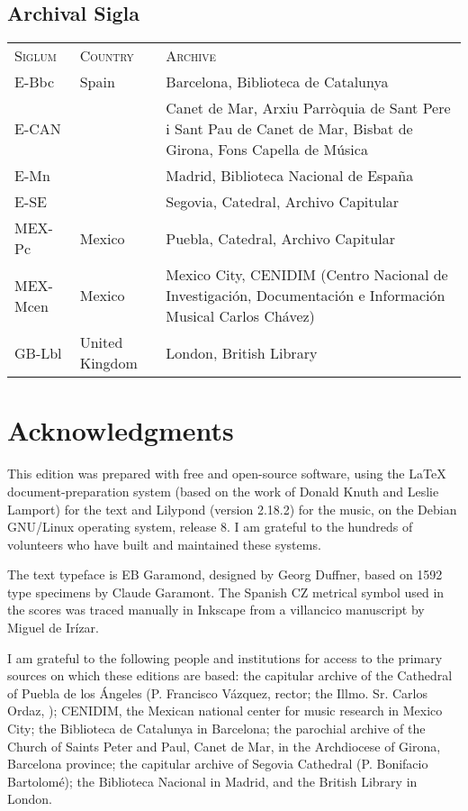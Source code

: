 \subsection{Archival Sigla}

\begin{tabu} to \textwidth{llZ}
\textsc{Siglum} & \textsc{Country} & \textsc{Archive}\\
E-Bbc & Spain & Barcelona, Biblioteca de Catalunya\\
E-CAN &  & Canet de Mar, Arxiu Parròquia de Sant Pere i Sant Pau de Canet de Mar, Bisbat de Girona, Fons Capella de Música\\
E-Mn & &  Madrid, Biblioteca Nacional de España\\
E-SE & & Segovia, Catedral, Archivo Capitular\\
MEX-Pc & Mexico &  Puebla, Catedral, Archivo Capitular\\
MEX-Mcen & Mexico & Mexico City, CENIDIM (Centro Nacional de Investigación, Documentación e Información Musical Carlos Chávez)\\
GB-Lbl & United Kingdom & London, British Library\\
\end{tabu}


\section{Acknowledgments}

This edition was prepared with free and open-source software, using the \LaTeX{} document-preparation system (based on the work of Donald Knuth and Leslie Lamport) for the text and Lilypond (version 2.18.2) for the music, on the Debian GNU/Linux operating system, release 8. 
I am grateful to the hundreds of volunteers who have built and maintained these systems.

The text typeface is EB Garamond, designed by Georg Duffner, based on 1592 type specimens by Claude Garamont.
The Spanish CZ metrical symbol used in the scores was traced manually in Inkscape from a villancico manuscript by Miguel de Irízar.

I am grateful to the following people and institutions for access to the primary sources on which these editions are based: 
the capitular archive of the Cathedral of Puebla de los Ángeles (P. Francisco Vázquez, rector; the Illmo. Sr. Carlos Ordaz, );
CENIDIM, the Mexican national center for music research in Mexico City;
the Biblioteca de Catalunya in Barcelona;
the parochial archive of the Church of Saints Peter and Paul, Canet de Mar, in the Archdiocese of Girona, Barcelona province;
the capitular archive of Segovia Cathedral (P. Bonifacio Bartolomé);
the Biblioteca Nacional in Madrid, and
the British Library in London.


